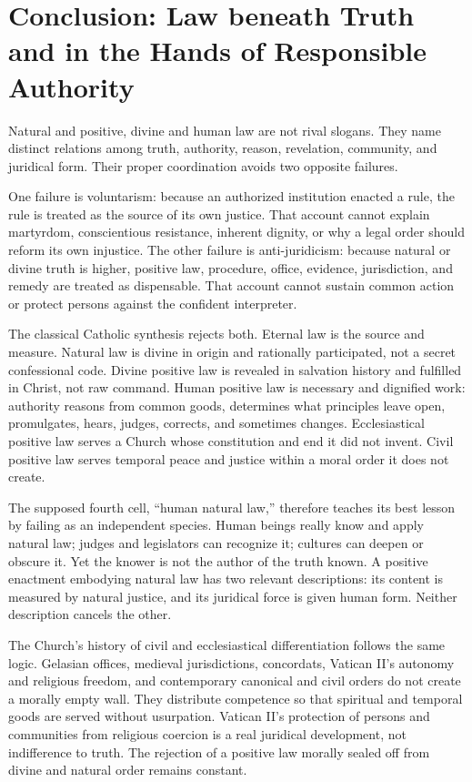 \section{Conclusion: Law beneath Truth and in the Hands of Responsible Authority}

Natural and positive, divine and human law are not rival slogans. They name distinct relations among truth, authority, reason, revelation, community, and juridical form. Their proper coordination avoids two opposite failures.

One failure is voluntarism: because an authorized institution enacted a rule, the rule is treated as the source of its own justice. That account cannot explain martyrdom, conscientious resistance, inherent dignity, or why a legal order should reform its own injustice. The other failure is anti-juridicism: because natural or divine truth is higher, positive law, procedure, office, evidence, jurisdiction, and remedy are treated as dispensable. That account cannot sustain common action or protect persons against the confident interpreter.

The classical Catholic synthesis rejects both. Eternal law is the source and measure. Natural law is divine in origin and rationally participated, not a secret confessional code. Divine positive law is revealed in salvation history and fulfilled in Christ, not raw command. Human positive law is necessary and dignified work: authority reasons from common goods, determines what principles leave open, promulgates, hears, judges, corrects, and sometimes changes. Ecclesiastical positive law serves a Church whose constitution and end it did not invent. Civil positive law serves temporal peace and justice within a moral order it does not create.

The supposed fourth cell, ``human natural law,'' therefore teaches its best lesson by failing as an independent species. Human beings really know and apply natural law; judges and legislators can recognize it; cultures can deepen or obscure it. Yet the knower is not the author of the truth known. A positive enactment embodying natural law has two relevant descriptions: its content is measured by natural justice, and its juridical force is given human form. Neither description cancels the other.

The Church's history of civil and ecclesiastical differentiation follows the same logic. Gelasian offices, medieval jurisdictions, concordats, Vatican II's autonomy and religious freedom, and contemporary canonical and civil orders do not create a morally empty wall. They distribute competence so that spiritual and temporal goods are served without usurpation. Vatican II's protection of persons and communities from religious coercion is a real juridical development, not indifference to truth. The rejection of a positive law morally sealed off from divine and natural order remains constant.

